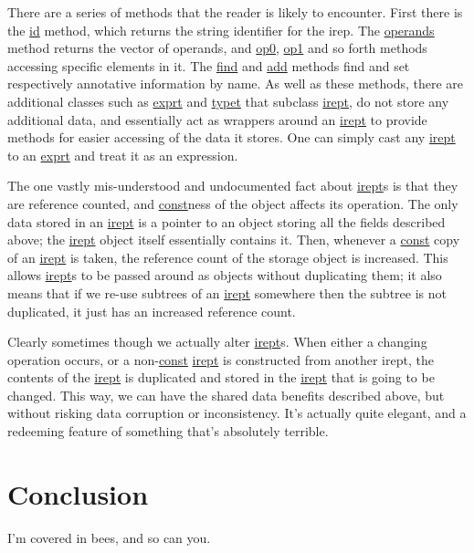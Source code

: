 \documentclass{article}
\begin{document}
There are a series of methods that the reader is likely to encounter. First
there is the \url{id} method, which returns the string identifier for the
irep. The \url{operands} method returns the vector of operands, and \url{op0},
\url{op1} and so forth methods accessing specific elements in it. The
\url{find} and \url{add} methods find and set respectively annotative
information by name. As well as these methods, there are additional classes
such as \url{exprt} and \url{typet} that subclass \url{irept}, do not store any
additional data, and essentially act as wrappers around an \url{irept} to
provide methods for easier accessing of the data it stores. One can simply
cast any \url{irept} to an \url{exprt} and treat it as an expression.

The one vastly mis-understood and undocumented fact about \url{irept}s is that
they are reference counted, and \url{const}ness of the object affects its
operation. The only data stored in an \url{irept} is a pointer to an object
storing all the fields described above; the \url{irept} object itself
essentially contains it. Then, whenever a \url{const} copy of an \url{irept}
is taken, the reference count of the storage object is increased. This allows
\url{irept}s to be passed around as objects without duplicating them; it also
means that if we re-use subtrees of an \url{irept} somewhere then the subtree
is not duplicated, it just has an increased reference count.

Clearly sometimes though we actually alter \url{irept}s. When either a
changing operation occurs, or a non-\url{const} \url{irept} is constructed from
another irept, the contents of the \url{irept} is duplicated and stored in
the \url{irept} that is going to be changed. This way, we can have the shared
data benefits described above, but without risking data corruption or
inconsistency. It's actually quite elegant, and a redeeming feature of something
that's absolutely terrible.

\section{Conclusion}

I'm covered in bees, and so can you.
\end{document}
